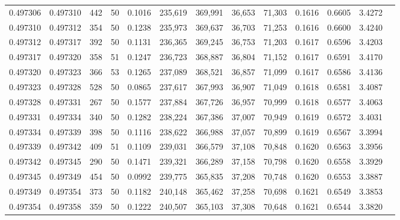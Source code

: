 \begin{tabular}{rrrrrrrrrrrrr}
0.497306 & 0.497310 & 442 &  50 &                                     0.1016 & 235,619 & 369,991 &  36,653 &  71,303 & 0.1616 & 0.6605 & 3.4272 \\
0.497310 & 0.497312 & 354 &  50 &                                     0.1238 & 235,973 & 369,637 &  36,703 &  71,253 & 0.1616 & 0.6600 & 3.4240 \\
0.497312 & 0.497317 & 392 &  50 &                                     0.1131 & 236,365 & 369,245 &  36,753 &  71,203 & 0.1617 & 0.6596 & 3.4203 \\
0.497317 & 0.497320 & 358 &  51 &                                     0.1247 & 236,723 & 368,887 &  36,804 &  71,152 & 0.1617 & 0.6591 & 3.4170 \\
0.497320 & 0.497323 & 366 &  53 &                                     0.1265 & 237,089 & 368,521 &  36,857 &  71,099 & 0.1617 & 0.6586 & 3.4136 \\
0.497323 & 0.497328 & 528 &  50 &                                     0.0865 & 237,617 & 367,993 &  36,907 &  71,049 & 0.1618 & 0.6581 & 3.4087 \\
0.497328 & 0.497331 & 267 &  50 &                                     0.1577 & 237,884 & 367,726 &  36,957 &  70,999 & 0.1618 & 0.6577 & 3.4063 \\
0.497331 & 0.497334 & 340 &  50 &                                     0.1282 & 238,224 & 367,386 &  37,007 &  70,949 & 0.1619 & 0.6572 & 3.4031 \\
0.497334 & 0.497339 & 398 &  50 &                                     0.1116 & 238,622 & 366,988 &  37,057 &  70,899 & 0.1619 & 0.6567 & 3.3994 \\
0.497339 & 0.497342 & 409 &  51 &                                     0.1109 & 239,031 & 366,579 &  37,108 &  70,848 & 0.1620 & 0.6563 & 3.3956 \\
0.497342 & 0.497345 & 290 &  50 &                                     0.1471 & 239,321 & 366,289 &  37,158 &  70,798 & 0.1620 & 0.6558 & 3.3929 \\
0.497345 & 0.497349 & 454 &  50 &                                     0.0992 & 239,775 & 365,835 &  37,208 &  70,748 & 0.1620 & 0.6553 & 3.3887 \\
0.497349 & 0.497354 & 373 &  50 &                                     0.1182 & 240,148 & 365,462 &  37,258 &  70,698 & 0.1621 & 0.6549 & 3.3853 \\
0.497354 & 0.497358 & 359 &  50 &                                     0.1222 & 240,507 & 365,103 &  37,308 &  70,648 & 0.1621 & 0.6544 & 3.3820 \\

\end{tabular}
